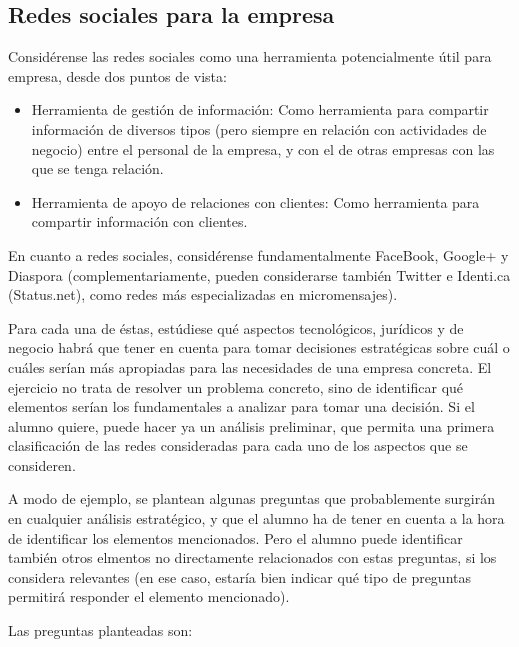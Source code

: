 \documentclass[a4paper,12pt]{article}
\begin{document}
\subsection{Redes sociales para la empresa}
\label{sub:redes-sociales-empresa}

Considérense las redes sociales como una herramienta potencialmente útil para empresa, desde dos puntos de vista:

\begin{itemize}
\item Herramienta de gestión de información: Como herramienta para compartir información de diversos tipos (pero siempre en relación con actividades de negocio) entre el personal de la empresa, y con el de otras empresas con las que se tenga relación.
\item Herramienta de apoyo de relaciones con clientes: Como herramienta para compartir información con clientes.
\end{itemize}

En cuanto a redes sociales, considérense fundamentalmente FaceBook, Google+ y Diaspora (complementariamente, pueden considerarse también Twitter e Identi.ca (Status.net), como redes más especializadas en micromensajes).

Para cada una de éstas, estúdiese qué aspectos tecnológicos, jurídicos y de negocio habrá que tener en cuenta para tomar decisiones estratégicas sobre cuál o cuáles serían más apropiadas para las necesidades de una empresa concreta. El ejercicio no trata de resolver un problema concreto, sino de identificar qué elementos serían los fundamentales a analizar para tomar una decisión. Si el alumno quiere, puede hacer ya un análisis preliminar, que permita una primera clasificación de las redes consideradas para cada uno de los aspectos que se consideren.

A modo de ejemplo, se plantean algunas preguntas que probablemente surgirán en cualquier análisis estratégico, y que el alumno ha de tener en cuenta a la hora de identificar los elementos mencionados. Pero el alumno puede identificar también otros elmentos no directamente relacionados con estas preguntas, si los considera relevantes (en ese caso, estaría bien indicar qué tipo de preguntas permitirá responder el elemento mencionado).

Las preguntas planteadas son:
\end{document}
